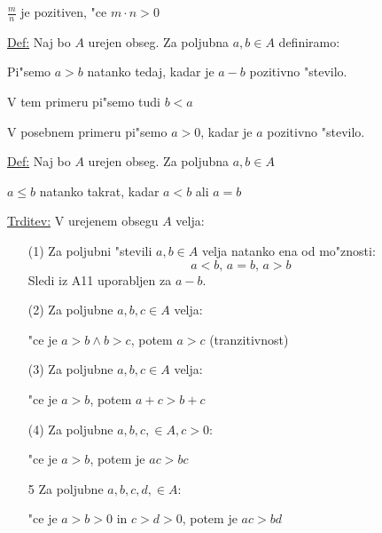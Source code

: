 \(\frac{m}{n}\) je pozitiven, "ce \(m \cdot n > 0\)

\underline{Def:} Naj bo \(A\) urejen obseg. Za poljubna \(a, b \in A\) definiramo:

\hspace*{12pt}Pi"semo \(a > b\) natanko tedaj, kadar je \(a - b\) pozitivno "stevilo.

\hspace*{12pt}V tem primeru pi"semo tudi \(b < a\)

\hspace*{12pt}V posebnem primeru pi"semo \(a > 0\), kadar je \(a\) pozitivno "stevilo.

\underline{Def:} Naj bo \(A\) urejen obseg. Za poljubna \(a, b \in A\)

\hspace*{12pt}\(a \leq b\) natanko takrat, kadar \(a < b\) ali \(a = b\)

\underline{Trditev:} V urejenem obsegu \(A\) velja:
\begin{enumerate}
	\item[(1)] Za poljubni "stevili \(a, b \in A\) velja natanko ena od mo"znosti:
	\[a < b \text{, } a = b \text{, } a > b\]
	Sledi iz A11 uporabljen za \(a - b\).
	
	\item[(2)] Za poljubne \(a, b, c \in A\) velja:
	
	"ce je \(a > b \land b > c\), potem \(a > c\) (tranzitivnost)
	\item[(3)] Za poljubne \(a, b, c \in A\) velja:
	
	"ce je \(a > b\), potem \(a + c > b + c\)
	\item[(4)] Za poljubne \(a, b, c, \in A, c > 0\):
	
	"ce je \(a > b\), potem je \(ac > bc\)
	\item[5] Za poljubne \(a, b, c, d, \in A\):
	
	"ce je \(a > b > 0\) in \(c > d > 0\), potem je \(ac > bd\)
\end{enumerate}

